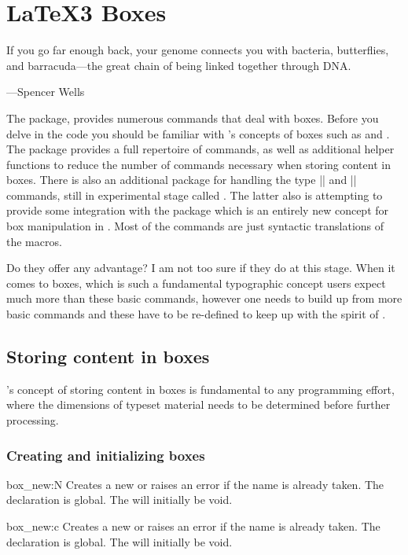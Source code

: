 \chapter{LaTeX3 Boxes}

\epigraph{If you go far enough back, your genome connects you with bacteria, butterflies, and barracuda---the great chain of being linked together through DNA.}{---Spencer Wells}

The  package, provides numerous commands that deal with boxes. Before you delve in the code you should be familiar with \tex’s concepts of boxes such as  and . The package provides a full repertoire of commands, as well as additional helper functions to reduce the number of commands necessary when storing content in boxes. There is also an additional package for handling the \latexe type |\fbox| and |\makebox| commands, still in experimental stage called . The latter also is attempting to provide some integration with the  package which is an entirely new concept for box manipulation in . Most of the commands are just syntactic translations of the \latexe macros. 

Do they offer any advantage? I am not too sure if they do at this stage. When it comes to boxes, which is such a fundamental typographic concept users expect much more than these basic commands, however one needs to build up from more basic commands and these have to be re-defined to keep up with the spirit of .

\section{Storing content in boxes}

\tex’s concept of storing content in boxes is fundamental to any programming effort, where the dimensions of typeset material needs to be determined before further processing.

\subsection{Creating and initializing boxes}
\begin{docCommand}{box_new:N} {  }
   Creates a new  or raises an error if the name is
   already taken. The declaration is global. The  will
   initially be void.
\end{docCommand}
\begin{docCommand}{box_new:c}{}
   Creates a new  or raises an error if the name is
   already taken. The declaration is global. The  will
   initially be void.
\end{docCommand}

